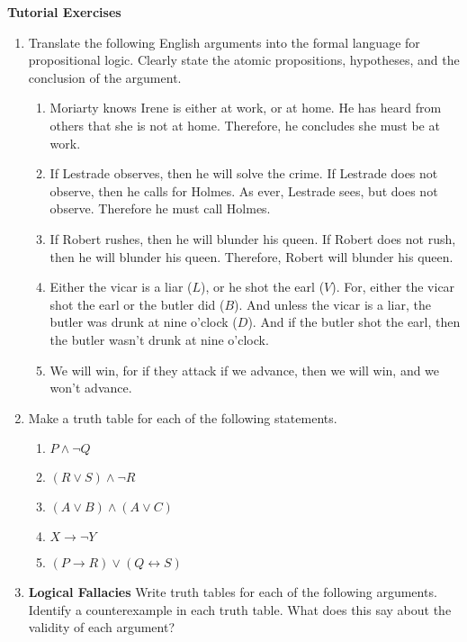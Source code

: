 \documentclass[11pt]{report}
\begin{document}
\newpage
{\bf Tutorial Exercises}
\begin{enumerate}
	
	
	\item Translate the following English arguments into the formal language for propositional logic. Clearly state the atomic propositions, hypotheses, and the conclusion of the argument. 
	
	\begin{enumerate}
		\item Moriarty knows Irene is either at work, or at home. He has heard from others that she is not at home. Therefore, he concludes she must be at work.
		
		\item  If Lestrade observes, then he will solve the crime. If Lestrade does not observe, then he calls for Holmes. As ever, Lestrade sees, but does not observe. Therefore he must call Holmes. 
		
		\item If Robert rushes, then he will blunder his queen. If Robert does not rush, then he will blunder his queen. Therefore, Robert will blunder his queen.
		
		\item Either the vicar is a liar ($L$), or he shot the earl ($V$). For, either the vicar shot the earl or the butler did ($B$). And unless the vicar is a liar, the butler was drunk at nine o'clock ($D$). And if the butler shot the earl, then the butler wasn't drunk at nine o'clock.

		\item We will win, for if they attack if we advance, then we will win, and we won't advance. 
	\end{enumerate}	
	 
	
	\item Make a truth table for each of the following statements.

	\begin{enumerate}
		\item $P \land \lnot Q$
		\item $(R \lor S) \wedge \neg R$
		\item $(A \lor B) \land (A \lor C)$
		\item $X \rightarrow \lnot Y$
		\item $(P \rightarrow R) \vee (Q \leftrightarrow S)$
	\end{enumerate}

	
	\item {\bf Logical Fallacies} Write truth tables for each of the following arguments. Identify a counterexample in each truth table. What does this say about the validity of each argument?  
	

\end{enumerate}
\end{document}
